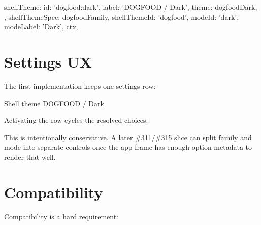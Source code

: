 \begin{CodeBlock}
{
  shellTheme: {
    id: 'dogfood:dark',
    label: 'DOGFOOD / Dark',
    theme: dogfoodDark,
  },
  shellThemeSpec: dogfoodFamily,
  shellThemeId: 'dogfood',
  modeId: 'dark',
  modeLabel: 'Dark',
  ctx,
}
\end{CodeBlock}

\section{Settings UX}\label{record-181-settings-ux}

The first implementation keeps one settings row:

\begin{CodeBlock}
Shell theme  DOGFOOD / Dark
\end{CodeBlock}

Activating the row cycles the resolved choices:



This is intentionally conservative. A later \#311/\#315 slice can split family and mode into separate controls once the app-frame has enough option metadata to render that well.

\section{Compatibility}\label{record-181-compatibility}

Compatibility is a hard requirement:

